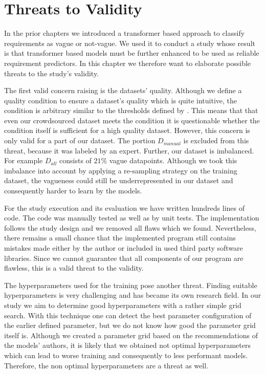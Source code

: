 \chapter{Threats to Validity}
\label{chp:threats_to_validity}
In the prior chapters we introduced a transformer based approach to classify requirements as vague or not-vague.
We used it to conduct a study whose result is that transformer based models must be further enhanced to be used as reliable requirement predictors.
In this chapter we therefore want to elaborate possible threats to the study's validity.

The first valid concern raising is the datasets' quality.
Although we define a quality condition to ensure a dataset's quality which is quite intuitive, the condition is arbitrary similar to the thresholds defined by \textcite{Landis:1977}.
This means that that even our crowdsourced dataset meets the condition it is questionable whether the condition itself is sufficient for a high quality dataset.
However, this concern is only valid for a part of our dataset.
The portion $D_{manual}$ is excluded from this threat, because it was labeled by an expert.
Further, our dataset is imbalanced.
For example $D_{all}$ consists of $21\%$ vague datapoints.
Although we took this imbalance into account by applying a re-sampling strategy on the training dataset, the vagueness could still be underrepresented in our dataset and consequently harder to learn by the models.

For the study execution and its evaluation we have written hundreds lines of code.
The code was manually tested as well as by unit tests.
The implementation follows the study design and we removed all flaws which we found.
Nevertheless, there remains a small chance that the implemented program still contains mistakes made either by the author or included in used third party software libraries.
Since we cannot guarantee that all components of our program are flawless, this is a valid threat to the validity.

The hyperparameters used for the training pose another threat.
Finding suitable hyperparameters is very challenging \parencite{Zeiler:2012} and has became its own research field.
In our study we aim to determine good hyperparameters with a rather simple grid search.
With this technique one can detect the best parameter configuration of the earlier defined parameter, but we do not know how good the parameter grid itself is.
Although we created a parameter grid based on the recommendations of the models' authors, it is likely that we obtained not optimal hyperparameters which can lead to worse training and consequently to less performant models.
Therefore, the non optimal hyperparameters are a threat as well.


